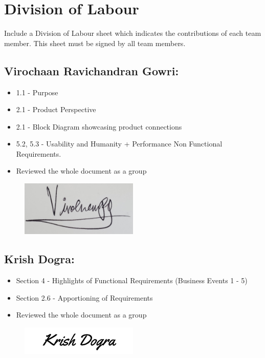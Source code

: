 \documentclass[]{article}
\begin{document}

\newpage
\appendix
\section{Division of Labour}
\label{sec:division_of_labour}
Include a Division of Labour sheet which indicates the contributions of each team member. This sheet must be signed by all team members.
\subsection*{Virochaan Ravichandran Gowri:}
\begin{itemize}
	\item 1.1 - Purpose
	\item 2.1 - Product Perspective
	\item 2.1 - Block Diagram showcasing product connections
	\item 5.2, 5.3 - Usability and Humanity + Performance Non Functional Requirements.
	\item Reviewed the whole document as a group
\end{itemize}
\begin{figure}[h]
	\centering
	\includegraphics[width=0.5\textwidth]{ViroSignature.jpg}
	\label{fig:signature}
\end{figure}

\subsection*{Krish Dogra:}
\begin{itemize}
	\item Section 4 - Highlights of Functional Requirements (Business Events 1 - 5)
	\item Section 2.6 - Apportioning of Requirements
	\item Reviewed the whole document as a group
\end{itemize}
\begin{figure}[h]
	\centering
	\includegraphics[width=0.5\textwidth]{KrishSignature.jpg}
	\label{fig:signature}
\end{figure}
\end{document}
